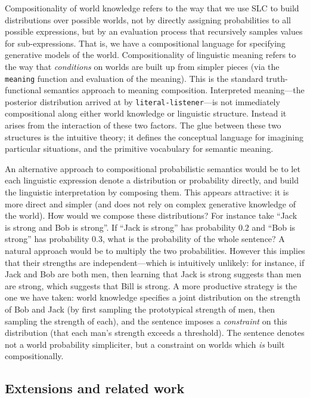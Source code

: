 \documentclass[pdfextras]{handbook}
\begin{document}
Compositionality of world knowledge refers to the way that we use SLC to build distributions over possible worlds, not by directly assigning probabilities to all possible expressions, but by an evaluation process that recursively samples values for sub-expressions. 
That is, we have a compositional language for specifying generative models of the world.
%
Compositionality of linguistic meaning  refers to the way that \emph{conditions} on worlds are built up from simpler pieces (via the \lstinline{meaning} function and evaluation of the meaning). 
This is the standard truth-functional semantics approach to meaning composition.
%
Interpreted meaning---the posterior distribution arrived at by \lstinline{literal-listener}---is not immediately compositional along either world knowledge or linguistic structure. 
Instead it arises from the interaction of these two factors.
The glue between these two structures is the intuitive theory; it defines the conceptual language for imagining particular situations, and the primitive  vocabulary for semantic meaning.

An alternative approach to compositional probabilistic semantics would be to let each linguistic expression denote a distribution or probability directly, and build the linguistic interpretation by composing them. This appears attractive: it is more direct and simpler (and does not rely on complex generative knowledge of the world). 
How would we compose these distributions? For instance take ``Jack is strong and Bob is strong''. If ``Jack is strong'' has probability $0.2$ and ``Bob is strong'' has probability $0.3$, what is the probability of the whole sentence? 
A natural approach would be to multiply the two probabilities. 
However this implies that their strengths are independent---which is intuitively unlikely: for instance, if Jack and Bob are both men, then learning that Jack is strong suggests than men are strong, which suggests that Bill is strong.
A more productive strategy is the one we have taken: world knowledge specifies a joint distribution on the strength of Bob and Jack (by first sampling the prototypical strength of men, then sampling the strength of each), and the sentence imposes a \emph{constraint} on this distribution (that each man's strength exceeds a threshold). 
The sentence denotes not a world probability simpliciter, but a constraint on worlds which \emph{is} built compositionally. 


\subsection{Extensions and related work}
\end{document}
